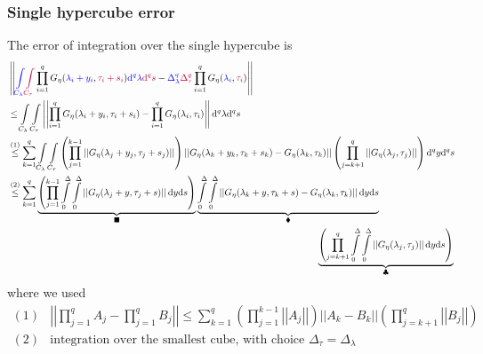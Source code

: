 \documentclass{article}
\renewcommand{\d}{\mathrm{d}}
\newcommand{\blue}[1]{\textcolor{blue}{#1}}
\newcommand{\purple}[1]{\textcolor{purple}{#1}}
\begin{document}
\subsubsection{Single hypercube error}
The error of integration over the single hypercube is
\begin{equation}
\begin{split}
    & \left|\left| \blue{\int\limits_{C_\lambda}} \purple{\int\limits_{C_\tau}} \prod_{i=1}^q G_\eta(\blue{\lambda_i+y_i},\purple{\tau_i+s_i})\blue{\d^q\lambda}\purple{\d^q s} - \blue{\Delta_\lambda^q}\purple{\Delta^q_\tau}\prod_{i=1}^q G_\eta(\blue{\lambda_i},\purple{\tau_i})\right|\right| \\ 
    &\leq \int\limits_{C_\lambda} \int\limits_{C_\tau} \left|\left| \prod_{i=1}^q G_\eta(\lambda_i+y_i,\tau_i+s_i) - \prod_{i=1}^q G_\eta(\lambda_i,\tau_i)\right|\right|\d^q\lambda\d^q s \\
    & \overset{(1)}{\leq} \sum_{k=1}^q \int\limits_{C_\lambda}\int\limits_{C_\tau}\left(\prod_{j=1}^{k-1}\left|\left| G_\eta(\lambda_j+y_j,\tau_j+s_j)\right|\right|\right) \left|\left| G_\eta(\lambda_k+y_k,\tau_k+s_k) - G_\eta(\lambda_k,\tau_k)\right|\right| \left(\prod_{j=k+1}^{q}\left|\left| G_\eta(\lambda_j,\tau_j)\right|\right|\right) \d^q y \d^q s \\
    &\overset{(2)}{\leq} \sum_{k=1}^q \underbrace{\left(\prod_{j=1}^{k-1}\int\limits_0^\Delta\int\limits_0^\Delta\left|\left| G_\eta(\lambda_j+y,\tau_j+s)\right|\right|\d y\d s\right)}_{\blacksquare} \underbrace{\int\limits_0^\Delta\int\limits_0^\Delta\left|\left| G_\eta(\lambda_k+y,\tau_k+s)  - G_\eta(\lambda_k,\tau_k)\right|\right| \d y\d s}_{\blacklozenge} \\
    & \quad \qquad \qquad \qquad \qquad \qquad \qquad \qquad \qquad \qquad \qquad \qquad \qquad \qquad \qquad \qquad \qquad \underbrace{\left(\prod_{j=k+1}^{q}\int\limits_0^\Delta\int\limits_0^\Delta\left|\left| G_\eta(\lambda_j,\tau_j)\right|\right|\d y\d s\right)}_{\clubsuit}
    \label{eq:hypercube}
\end{split}
\end{equation}
where we used
\begin{equation}
\begin{split}
    (1)& \left|\left| \prod_{j=1}^q A_j - \prod_{j=1}^q B_j \right|\right| \leq \sum_{k=1}^q \left(\prod_{j=1}^{k-1}\left|\left| A_j\right|\right|\right) \left|\left| A_k-B_k \right|\right| \left(\prod_{j=k+1}^{q}\left|\left| B_j\right|\right|\right) \\
    (2)& \text{integration over the smallest cube, with choice }\Delta_\tau=\Delta_\lambda
\end{split}
\end{equation}
\end{document}
